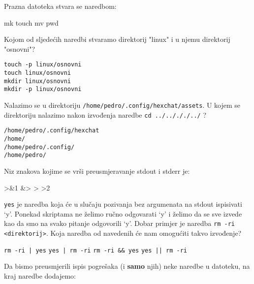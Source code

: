 \documentclass[a4paper,11pt]{exam}
\newcommand{\shell}[1]{\texttt{#1}}
\begin{document}
\begin{questions}
	\question
  Prazna datoteka stvara se naredbom:

	\begin{oneparchoices}
		\choice mk
		\CorrectChoice touch
		\choice mv
		\choice pwd
	\end{oneparchoices}
	
	\question
	Kojom od sljedećih naredbi stvaramo direktorij "linux" i u njemu direktorij "osnovni"? 
	
	\begin{oneparchoices}
		\choice \shell{touch -p linux/osnovni} \\
		\choice \shell{touch linux/osnovni} \\
		\choice \shell{mkdir linux/osnovni} \\
		\CorrectChoice \shell{mkdir -p linux/osnovni}
	\end{oneparchoices}
	
	\question
  Nalazimo se u direktoriju \shell{/home/pedro/.config/hexchat/assets}. U kojem se direktoriju nalazimo nakon izvođenja naredbe  \shell{cd ../../././../} ? 

	\begin{oneparchoices}
		\choice \shell{/home/pedro/.config/hexchat} \\
		\choice \shell{/home/} \\
		\choice \shell{/home/pedro/.config/} \\
		\CorrectChoice \shell{/home/pedro/}
	\end{oneparchoices}
	
	\question
 Niz znakova kojime se vrši preusmjeravanje stdout i stderr je: 
	\begin{oneparchoices}
		>\&1 
		\CorrectChoice \&> 
		\choice >
		\choice >2
	\end{oneparchoices}
	
	\question
\shell{yes} je naredba koja će u slučaju pozivanja bez argumenata na stdout ispisivati ‘y’. Ponekad skriptama ne želimo ručno odgovarati ‘y’ i želimo da se sve izvede kao da smo na svako pitanje odgovorili ‘y’. Dobar primjer je naredba \shell{rm -ri <direktorij>}. Koja naredba od navedenih će nam omogućiti takvo izvođenje?
	
	\begin{oneparchoices}
		\choice \shell{rm -ri | yes} 
		\CorrectChoice \shell{yes | rm -ri} 
		\choice \shell{rm -ri \&\& yes} 
		\choice \shell{yes || rm -ri}
	\end{oneparchoices}
	
	\question
  Da bismo preusmjerili ispis pogrešaka (i \textbf{samo} njih) neke naredbe u datoteku, na kraj naredbe dodajemo:


\end{questions}
\end{document}
